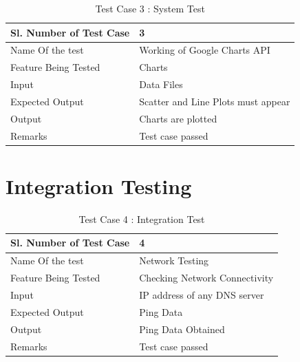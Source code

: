 \documentclass[12pt]{report}
\begin{document}
\begin{table}
    \begin{tabular}{|l|l|}
    \hline
    Sl. Number of Test Case & 3                                  \\ \hline
    Name Of the test        & Working of Google Charts API       \\ \hline
    Feature Being Tested    & Charts                             \\ \hline
    Input                   & Data Files                         \\ \hline
    Expected Output         & Scatter and Line Plots must appear \\ \hline
    Output                  & Charts are plotted                 \\ \hline
    Remarks                 & Test case passed                   \\ \hline
    \end{tabular}
    \caption {Test Case 3 : System Test}
\end{table}

\section{Integration Testing}

\begin{table}
    \begin{tabular}{|l|l|}
    \hline
    Sl. Number of Test Case & 4                             \\ \hline
    Name Of the test        & Network Testing               \\ \hline
    Feature Being Tested    & Checking Network Connectivity \\ \hline
    Input                   & IP address of any DNS server  \\ \hline
    Expected Output         & Ping Data                     \\ \hline
    Output                  & Ping Data Obtained            \\ \hline
    Remarks                 & Test case passed              \\ \hline
    \end{tabular}
    \caption {Test Case 4 : Integration Test}
\end{table}


\pagestyle{fancy}
\chead{}
\rfoot{\small{\thepage}}
\renewcommand{\headrulewidth}{0.4pt}
\renewcommand{\footrulewidth}{0.4pt}
\end{document}
